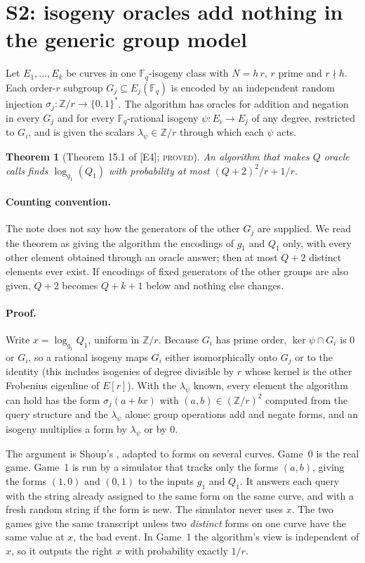 \documentclass[10pt,a4paper]{article}
\newcommand{\FF}{\mathbb{F}}
\newcommand{\ZZ}{\mathbb{Z}}
\newcommand{\ev}[1]{\textup{[#1]}}
\newtheorem{theorem}{Theorem}
\theoremstyle{definition}
\theoremstyle{remark}
\begin{document}
\section{S2: isogeny oracles add nothing in the generic group model}
\label{sec:s2}

Let $E_1,\dots,E_k$ be curves in one $\FF_q$-isogeny class with $N=h\,r$, $r$
prime and $r\nmid h$. Each order-$r$ subgroup $G_j\subseteq E_j(\FF_q)$ is encoded
by an independent random injection $\sigma_j:\ZZ/r\to\{0,1\}^{*}$. The algorithm
has oracles for addition and negation in every $G_j$ and for every
$\FF_q$-rational isogeny $\psi:E_i\to E_j$ of any degree, restricted to $G_i$,
and is given the scalars $\lambda_\psi\in\ZZ/r$ through which each $\psi$ acts.

\begin{theorem}[Theorem 15.1 of \ev{E4}; \textsc{proved}]
\label{thm:151}
An algorithm that makes $Q$ oracle calls finds $\log_{g_1}(Q_1)$ with
probability at most $(Q+2)^2/r + 1/r$.
\end{theorem}

\paragraph{Counting convention.}
The note does not say how the generators of the other $G_j$ are supplied. We read
the theorem as giving the algorithm the encodings of $g_1$ and $Q_1$ only, with
every other element obtained through an oracle answer; then at most $Q+2$ distinct
elements ever exist. If encodings of fixed generators of the other groups are
also given, $Q+2$ becomes $Q+k+1$ below and nothing else changes.

\paragraph{Proof.}
Write $x=\log_{g_1}Q_1$, uniform in $\ZZ/r$. Because $G_i$ has prime order,
$\ker\psi\cap G_i$ is $0$ or $G_i$, so a rational isogeny maps $G_i$ either
isomorphically onto $G_j$ or to the identity (this includes isogenies of degree
divisible by $r$ whose kernel is the other Frobenius eigenline of $E[r]$). With
the $\lambda_\psi$ known, every element the algorithm can hold has the form
$\sigma_j(a+bx)$ with $(a,b)\in(\ZZ/r)^2$ computed from the query structure and
the $\lambda_\psi$ alone: group operations add and negate forms, and an isogeny
multiplies a form by $\lambda_\psi$ or by $0$.

The argument is Shoup's \cite{Sho97}, adapted to forms on several curves.
Game~0 is the real game. Game~1 is run by a simulator that tracks only the forms
$(a,b)$, giving the forms $(1,0)$ and $(0,1)$ to the inputs $g_1$ and $Q_1$. It answers each query with the string already assigned to the same form
on the same curve, and with a fresh random string if the form is new. The simulator
never uses $x$. The two games give the same transcript unless two \emph{distinct}
forms on one curve have the same value at $x$, the bad event. In Game~1 the
algorithm's view is independent of $x$, so it outputs the right $x$ with
probability exactly $1/r$.
\end{document}
